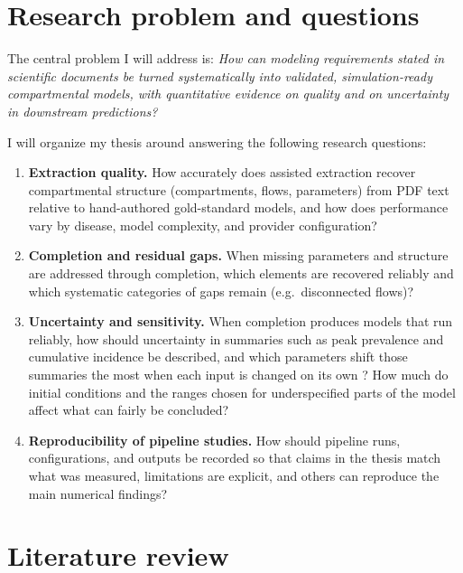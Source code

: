 \documentclass[a4paper,12pt]{article}
\begin{document}
\section{Research problem and questions}

The central problem I will address is: \emph{How can modeling requirements stated in scientific documents be turned systematically into validated, simulation-ready compartmental models, with quantitative evidence on quality and on uncertainty in downstream predictions?}

I will organize my thesis around answering the following research questions:

\begin{enumerate}[label=\textbf{RQ\arabic*:}, leftmargin=*]
  \item \textbf{Extraction quality.} How accurately does assisted extraction recover compartmental structure (compartments, flows, parameters) from PDF text relative to hand-authored gold-standard models, and how does performance vary by disease, model complexity, and provider configuration?
  \item \textbf{Completion and residual gaps.} When missing parameters and structure are addressed through completion, which elements are recovered reliably and which systematic categories of gaps remain (e.g.\ disconnected flows)?
  \item \textbf{Uncertainty and sensitivity.} When completion produces models that run reliably, how should uncertainty in summaries such as peak prevalence and cumulative incidence be described, and which parameters shift those summaries the most when each input is changed on its own \citep{morris1991factorial}? How much do initial conditions and the ranges chosen for underspecified parts of the model affect what can fairly be concluded?
  \item \textbf{Reproducibility of pipeline studies.} How should pipeline runs, configurations, and outputs be recorded so that claims in the thesis match what was measured, limitations are explicit, and others can reproduce the main numerical findings?
\end{enumerate}
\section{Literature review}
\end{document}
